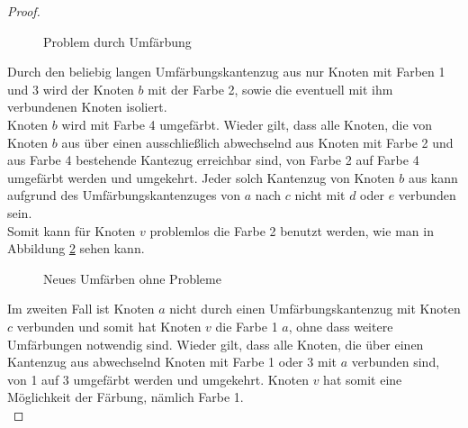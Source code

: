 \begin{proof}
\begin{figure}
\centering
{}
\caption{Problem durch Umfärbung}
\label{graph4}
\end{figure}
Durch den beliebig langen Umfärbungskantenzug aus nur Knoten mit Farben 1 und 3 wird der Knoten $b$ mit der Farbe 2, sowie die eventuell mit ihm verbundenen Knoten isoliert.\\
Knoten $b$ wird mit Farbe 4 umgefärbt. Wieder gilt, dass alle Knoten, die von Knoten $b$ aus über einen ausschließlich abwechselnd aus Knoten mit Farbe 2 und aus Farbe 4 bestehende Kantezug erreichbar sind, von Farbe 2 auf Farbe 4 umgefärbt werden und umgekehrt. Jeder solch Kantenzug von Knoten $b$ aus kann aufgrund des Umfärbungskantenzuges von $a$ nach $c$ nicht mit $d$ oder $e$ verbunden sein.\\
Somit kann für Knoten $v$ problemlos die Farbe 2 benutzt werden, wie man in Abbildung \ref{graph5} sehen kann.
\\
\begin{figure}
\centering
{}
\caption{Neues Umfärben ohne Probleme}
\label{graph5}
\end{figure}
Im zweiten Fall ist Knoten $a$ nicht durch einen Umfärbungskantenzug mit Knoten $c$ verbunden und somit hat Knoten $v$ die Farbe 1 $a$, ohne dass weitere Umfärbungen notwendig sind. Wieder gilt, dass alle Knoten, die über einen Kantenzug aus abwechselnd Knoten mit Farbe 1 oder 3 mit $a$ verbunden sind, von 1 auf 3 umgefärbt werden und umgekehrt. Knoten $v$ hat somit eine Möglichkeit der Färbung, nämlich Farbe 1.\\

\end{proof}

